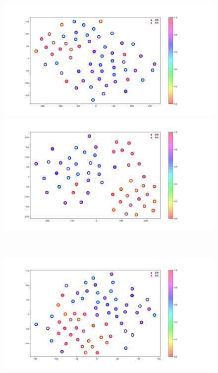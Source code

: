 \begin{figure}[h]
 \begin{minipage}[b]{0.48\linewidth}
  \centering
  \includegraphics[scale=0.15]{./imgs/tSNE/cake_1.pdf}
 \end{minipage}
 \begin{minipage}[b]{0.48\linewidth}
  \centering
  \includegraphics[scale=0.15]{./imgs/tSNE/cake_2.pdf}
 \end{minipage}\\
 \begin{minipage}[b]{0.48\linewidth}
  \centering
  \includegraphics[scale=0.15]{./imgs/tSNE/cake_3.pdf}

\end{minipage}
\end{figure}
